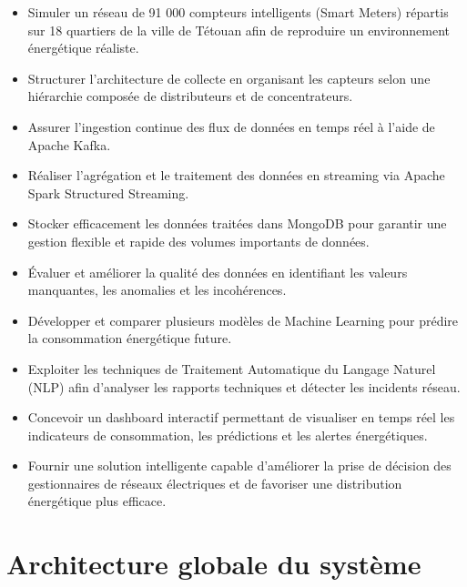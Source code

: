 \documentclass[12pt,a4paper]{report}
\begin{document}
\begin{itemize}
    \item Simuler un réseau de 91 000 compteurs intelligents (Smart Meters) répartis sur 18 quartiers de la ville de Tétouan afin de reproduire un environnement énergétique réaliste.
    
    \item Structurer l’architecture de collecte en organisant les capteurs selon une hiérarchie composée de distributeurs et de concentrateurs.
    
    \item Assurer l’ingestion continue des flux de données en temps réel à l’aide de Apache Kafka.
    
    \item Réaliser l’agrégation et le traitement des données en streaming via Apache Spark Structured Streaming.
    
    \item Stocker efficacement les données traitées dans MongoDB pour garantir une gestion flexible et rapide des volumes importants de données.
    
    \item Évaluer et améliorer la qualité des données en identifiant les valeurs manquantes, les anomalies et les incohérences.
    
    \item Développer et comparer plusieurs modèles de Machine Learning pour prédire la consommation énergétique future.
    
    \item Exploiter les techniques de Traitement Automatique du Langage Naturel (NLP) afin d’analyser les rapports techniques et détecter les incidents réseau.
    
    \item Concevoir un dashboard interactif permettant de visualiser en temps réel les indicateurs de consommation, les prédictions et les alertes énergétiques.
    
    \item Fournir une solution intelligente capable d’améliorer la prise de décision des gestionnaires de réseaux électriques et de favoriser une distribution énergétique plus efficace.
\end{itemize}

\chapter{Architecture globale du système}
\end{document}
